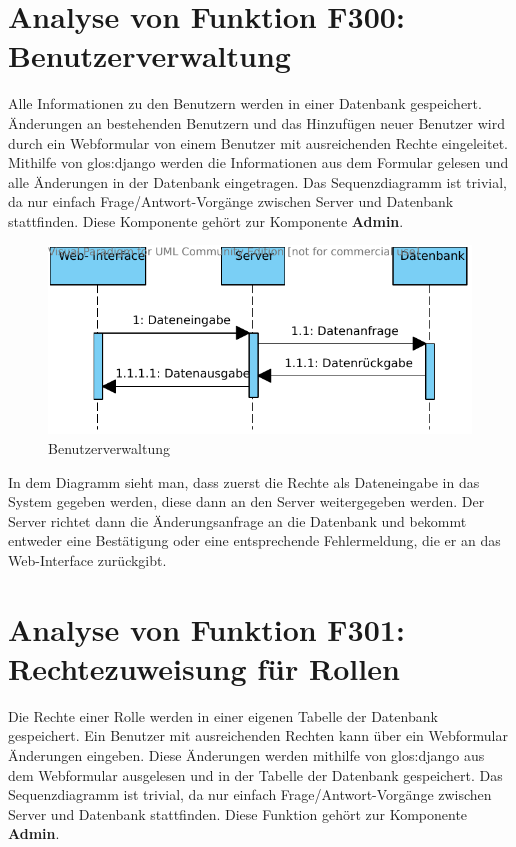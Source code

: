 \section{Analyse von Funktion F300: Benutzerverwaltung}
Alle Informationen zu den Benutzern werden in einer Datenbank gespeichert. Änderungen an bestehenden Benutzern und das Hinzufügen neuer Benutzer wird durch ein Webformular von einem Benutzer mit ausreichenden Rechte eingeleitet. Mithilfe von \gls{glos:django} werden die Informationen aus dem Formular gelesen und alle Änderungen in der Datenbank eingetragen. Das Sequenzdiagramm ist trivial, da nur einfach Frage/Antwort-Vorgänge zwischen Server und Datenbank stattfinden. Diese Komponente gehört zur Komponente \textbf{Admin}.

\begin{figure}[H]
\includegraphics[width=0.8\linewidth]{bilder/f300.pdf}
\caption[Benutzerverwaltung]{Benutzerverwaltung}
\label{fig:300}
\end{figure}

In dem Diagramm sieht man, dass zuerst die Rechte als Dateneingabe in das
System gegeben werden, diese dann an den Server weitergegeben werden. Der
Server richtet dann die Änderungsanfrage an die Datenbank und bekommt entweder
eine Bestätigung oder eine entsprechende Fehlermeldung, die er an das
Web-Interface zurückgibt.

\section{Analyse von Funktion F301: Rechtezuweisung für Rollen}
Die Rechte einer Rolle werden in einer eigenen Tabelle der Datenbank gespeichert. Ein Benutzer mit ausreichenden Rechten kann über ein Webformular Änderungen eingeben. Diese Änderungen werden mithilfe von \gls{glos:django} aus dem Webformular ausgelesen und in der Tabelle der Datenbank gespeichert. Das Sequenzdiagramm ist trivial, da nur einfach Frage/Antwort-Vorgänge zwischen Server und Datenbank stattfinden. Diese Funktion gehört zur Komponente \textbf{Admin}.


